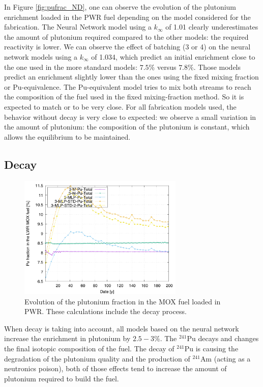 \documentclass[12pt]{article}
\begin{document}
In Figure \ref{fig:pufrac_ND}, one can observe the evolution of the plutonium
enrichment loaded in the PWR fuel depending on the model considered for the
fabrication. The Neural Network model using a $k_{\infty}$ of 1.01 clearly
underestimates the amount of plutonium required compared to the other models:
the required reactivity is lower. We can observe the effect of batching (3 or 4)
on the neural network models using a $k_{\infty}$ of 1.034, which predict an
initial enrichment close to the one used in the more standard models: $7.5\%$
versus $7.8\%$. Those models predict an enrichment slightly lower than the ones
using the fixed mixing fraction or Pu-equivalence. The Pu-equivalent model
tries to mix both streams to reach the composition of the fuel used in the fixed
mixing-fraction method. So it is expected to match or to be very close. For all
fabrication models used, the behavior without decay is very close to expected:
we observe a small variation in the amount of plutonium: the composition of the
plutonium is constant, which allows the equilibrium to be maintained. 


\subsection{Decay}

\begin{figure}[h!]
  \centering
  \includegraphics[width=0.7\textwidth]  {img/C_1_3_MOX_pu_contribution}
  \caption{Evolution of the plutonium fraction in the MOX fuel loaded in PWR.
  These calculations include the decay process.}
  \label{fig:puflow_D}
\end{figure}

When decay is taking into account, all models based on the neural network
increase the enrichment in plutonium by $2.5-3\%$. The $^{241}$Pu decays and
changes the final isotopic composition of the fuel.  The decay of $^{241}$Pu is
causing the degradation of the plutonium quality and the production of
$^{241}$Am (acting as a neutronics poison), both of those effects tend to
increase the amount of plutonium required to build the fuel.
\end{document}
